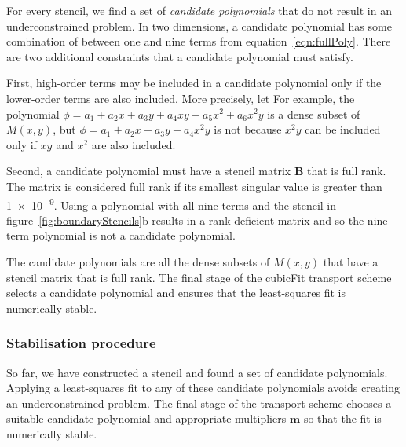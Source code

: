 For every stencil, we find a set of \textit{candidate polynomials} that do not result in an underconstrained problem.
In two dimensions, a candidate polynomial has some combination of between one and nine terms from equation~\eqref{eqn:fullPoly}.  There are two additional constraints that a candidate polynomial must satisfy.

First, high-order terms may be included in a candidate polynomial only if the lower-order terms are also included.
More precisely, let
For example, the polynomial $\phi = a_1 + a_2 x + a_3 y + a_4 xy + a_5 x^2 + a_6 x^2 y$ is a dense subset of $M(x,y)$, but $\phi = a_1 + a_2 x + a_3 y + a_4 x^2 y$ is not because $x^2 y$ can be included only if $xy$ and $x^2$ are also included.

Second, a candidate polynomial must have a stencil matrix $\mathbf{B}$ that is full rank.  The matrix is considered full rank if its smallest singular value is greater than \num{1e-9}.
Using a polynomial with all nine terms and the stencil in figure~\ref{fig:boundaryStencils}b results in a rank-deficient matrix and so the nine-term polynomial is not a candidate polynomial.

The candidate polynomials are all the dense subsets of $M(x,y)$  that have a stencil matrix that is full rank.  The final stage of the cubicFit transport scheme selects a candidate polynomial and ensures that the least-squares fit is numerically stable.

\subsubsection{Stabilisation procedure}
\label{sec:stabilisation}
So far, we have constructed a stencil and found a set of candidate polynomials.  Applying a least-squares fit to any of these candidate polynomials avoids creating an underconstrained problem.  The final stage of the transport scheme chooses a suitable candidate polynomial and appropriate multipliers $\mathbf{m}$ so that the fit is numerically stable.

